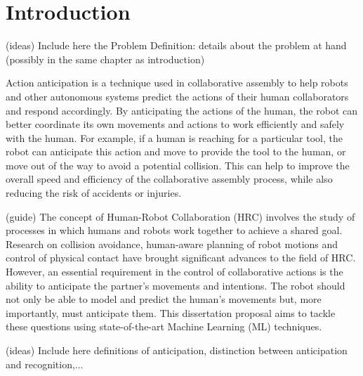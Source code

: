 \chapter{Introduction}
\label{chapter:introduction}


{\color{red}
(ideas) Include here the Problem Definition: details about the problem at hand (possibly in the same chapter as introduction)
}

{\color{gray}
Action anticipation is a technique used in collaborative assembly to help robots and other autonomous systems predict the actions of their human collaborators and respond accordingly. By anticipating the actions of the human, the robot can better coordinate its own movements and actions to work efficiently and safely with the human. For example, if a human is reaching for a particular tool, the robot can anticipate this action and move to provide the tool to the human, or move out of the way to avoid a potential collision. This can help to improve the overall speed and efficiency of the collaborative assembly process, while also reducing the risk of accidents or injuries.
}

{\color{red}
(guide) The concept of Human-Robot Collaboration (HRC) involves the study of processes in which humans and robots work together to achieve a shared goal. Research on collision avoidance, human-aware planning of robot motions and control of physical contact have brought significant advances to the field of HRC. However, an essential requirement in the control of collaborative actions is the ability to anticipate the partner’s movements and intentions. The robot should not only be able to model and predict the human’s movements but, more importantly, must anticipate them. This dissertation proposal aims to tackle these questions using state-of-the-art Machine Learning (ML) techniques.
}

{\color{red}
(ideas) Include here definitions of anticipation, distinction between anticipation and recognition,...
}


